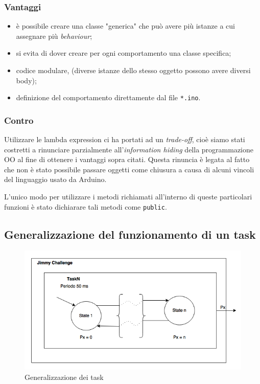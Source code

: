 \subsubsection{Vantaggi}
\begin{itemize}
	\item è possibile creare una classe "generica" che può avere più istanze a cui assegnare più \textit{behaviour};
	\item si evita di dover creare per ogni comportamento una classe specifica;
	\item codice modulare, (diverse istanze dello stesso oggetto possono avere diversi body);
	\item definizione del comportamento direttamente dal file \texttt{*.ino}.
\end{itemize}

\subsubsection{Contro}
Utilizzare le lambda expression ci ha portati ad un \textit{trade-off}, cioè siamo stati costretti a rinunciare parzialmente all'\textit{information hiding} della programmazione OO al fine di ottenere i vantaggi sopra citati. Questa rinuncia è legata al fatto che non è stato possibile passare oggetti come chiusura a causa di alcuni vincoli del linguaggio usato da Arduino.

L'unico modo per utilizzare i metodi richiamati all'interno di queste particolari funzioni è stato dichiarare tali metodi come \texttt{public}.

\newpage
\subsection{Generalizzazione del funzionamento di un task}
\begin{figure}[!ht]
	\centering
	\includegraphics[scale=.60]{img/task_generic.png}
	\caption{Generalizzazione dei task}
\end{figure}

